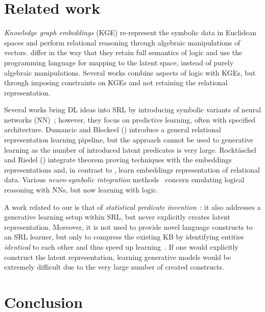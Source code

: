 \section{Related work}
\label{sec:relatedwork}


\textit{Knowledge graph embeddings} \cite{Nickel0TG16} (KGE) re-represent the symbolic data in Euclidean spaces and perform relational reasoning through algebraic manipulations of vectors.
 differ in the way that they retain full semantics of logic and use the programming language for mapping to the latent space, instead of purely algebraic manipulations.
Several works \cite{DBLP:conf/uai/MinerviniDRR17,demeester2016lifted} combine aspects of logic with KGEs, but through imposing constraints on KGEs and not retaining the relational representation.



Several works bring DL ideas into SRL by introducing symbolic variants of neural networks (NN)~\cite{Sourek:2015:LRN:2996831.2996838,Kazemi2018}; however, they focus on predictive learning, often with specified architecture.
Dumancic and Blockeel (\cite{Dumancic2017}) introduce a general relational representation learning pipeline, but the approach cannot be used to generative learning as the number of introduced latent predicates is very large.
Rockt\"{a}schel and Riedel (\cite{DTP2017}) integrate theorem proving techniques with the embeddings representations and, in contrast to , learn embeddings representation of relational data.
Various \textit{neuro-symbolic integration} methods~\cite{Besold2017NeuralSymbolicLA} concern emulating logical reasoning with NNs, but now learning with logic.





A work related to our is that of \textit{statistical predicate invention}~\cite{Kok2007}: it also addresses a generative learning setup within SRL, but never explicitly creates latent representation.
Moreover, it is not used to provide novel language constructs to an SRL learner, but only to compress the existing KB by identifying entities \textit{identical} to each other and thus speed up learning~\cite{Kok:2009:LML:1553374.1553440}.
If one would explicitly construct the latent representation, learning generative models would be extremely difficult due to the very large number of created constructs.



\section{Conclusion}


